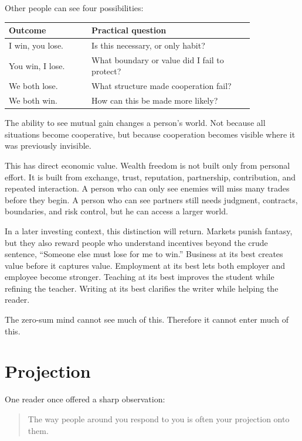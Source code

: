 Other people can see four possibilities:

\begin{center}
\begin{tabular}{p{0.28\linewidth}p{0.55\linewidth}}
\hline
Outcome & Practical question \\
\hline
I win, you lose. & Is this necessary, or only habit? \\
You win, I lose. & What boundary or value did I fail to protect? \\
We both lose. & What structure made cooperation fail? \\
We both win. & How can this be made more likely? \\
\hline
\end{tabular}
\end{center}

The ability to see mutual gain changes a person's world. Not because all situations become cooperative, but because cooperation becomes visible where it was previously invisible.

This has direct economic value. Wealth freedom is not built only from personal effort. It is built from exchange, trust, reputation, partnership, contribution, and repeated interaction. A person who can only see enemies will miss many trades before they begin. A person who can see partners still needs judgment, contracts, boundaries, and risk control, but he can access a larger world.

In a later investing context, this distinction will return. Markets punish fantasy, but they also reward people who understand incentives beyond the crude sentence, ``Someone else must lose for me to win.'' Business at its best creates value before it captures value. Employment at its best lets both employer and employee become stronger. Teaching at its best improves the student while refining the teacher. Writing at its best clarifies the writer while helping the reader.

The zero-sum mind cannot see much of this. Therefore it cannot enter much of this.

\section*{Projection}

One reader once offered a sharp observation:

\begin{quote}
The way people around you respond to you is often your projection onto them.
\end{quote}

